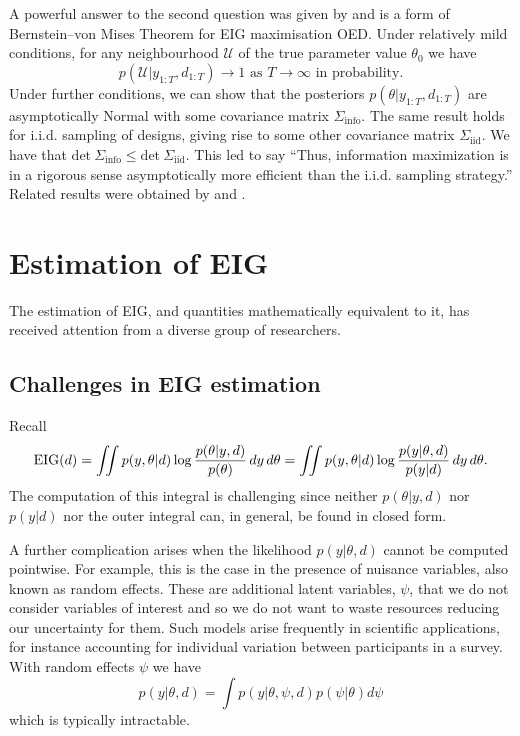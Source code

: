 A powerful answer to the second question was given by \cite{paninski2005} and is a form of Bernstein--von Mises Theorem for EIG maximisation OED. Under relatively mild conditions, for any neighbourhood $\mathcal{U}$ of the true parameter value $\theta_0$ we have
\begin{equation}
	p(\mathcal{U} | y_{1:T}, d_{1:T}) \to 1 \text{ as } T \to \infty \text{ in probability.}
\end{equation}
Under further conditions, we can show that the posteriors $p(\theta | y_{1:T}, d_{1:T})$ are asymptotically Normal with some covariance matrix $\Sigma_\text{info}$. The same result holds for i.i.d. sampling of designs, giving rise to some other covariance matrix $\Sigma_\text{iid}$. We have that $\text{det}\ \Sigma_\text{info} \le \text{det}\ \Sigma_\text{iid}$. This led \cite{paninski2005} to say ``Thus, information maximization is in a rigorous sense asymptotically more efficient than the i.i.d. sampling strategy.'' Related results were obtained by \cite{pronzato2010} and \cite{hu1998}.

\section{Estimation of EIG}
\label{sec:esteig}
The estimation of EIG, and quantities mathematically equivalent to it, has received attention from a diverse group of researchers.

\subsection{Challenges in EIG estimation}
\label{sec:challenges}
Recall
\begin{align}
	\label{eig:post}
	\text{EIG}(d) =
	\iint  p(y, \theta | d) \log \frac{p(\theta | y, d)}{p(\theta)} \, dy\,  d\theta
	=\iint  p(y, \theta | d) \log \frac{p(y | \theta, d)}{p(y|d)} \, dy\,  d\theta.
\end{align}
The computation of this integral is challenging since neither $p(\theta|y,d)$ nor $p(y|d)$ nor the outer integral can, in general, be found in closed form.

A further complication arises when the likelihood $p(y|\theta,d)$ cannot be computed pointwise. For example, this is the case in the presence of nuisance variables, also known as random effects. 
These are additional latent variables, $\psi$, that we do not consider variables of interest and so we do not want to waste resources reducing our uncertainty for them. 
Such models arise frequently in scientific applications, for instance accounting for individual variation between participants in a survey. With random effects $\psi$ we have
\begin{equation}
	p(y|\theta, d) = \int p(y|\theta, \psi, d) p(\psi | \theta) d\psi
\end{equation}
which is typically intractable.

